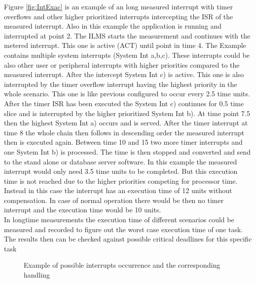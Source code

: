 Figure \ref{fig:IntExac} is an example of an long measured interrupt with timer overflows and other higher prioritized interrupts intercepting the \ac{ISR} of the measured interrupt. Also in this example the application is running and interrupted at point 2. The \ac{ILMS} starts the measurement and continues with the metered interrupt. This one is active (ACT) until point in time 4. The Example contains multiple system interrupts (System Int a,b,c). These interrupts could be also other user or peripheral interrupts with higher priorities compared to the measured interrupt. After the intercept System Int c) is active. This one is also interrupted by the timer overflow interrupt having the highest priority in the whole scenario. This one is like previous configured to occur every 2.5 time units. After the timer \ac{ISR} has been executed the System Int c) continues for 0.5 time slice and is interrupted by the higher prioritized System Int b). At time point 7.5 then the highest System Int a) occurs and is served. After the timer interrupt at time 8 the whole chain then follows in descending order the measured interrupt then is executed again. Between time 10 and 15 two more timer interrupts and one System Int b) is processed. The time is then stopped and converted and send to the stand alone or database server software. In this example the measured interrupt would only need 3.5 time units to be completed. But this execution time is not reached due to the higher priorities competing for processor time. Instead in this case the interrupt has an execution time of 12 units without compensation. In case of normal operation there would be then no timer interrupt and the execution time would be 10 units.\\ 
In longtime measurements the execution time of different scenarios could be measured and recorded to figure out the worst case execution time of one task. The results then can be checked against possible critical deadlines for this specific task\\
\begin{figure}[H]
		\begin{center}
		
		\caption{Example of possible interrupts occurrence and the corresponding handling}
		\label{fig:IntEX}
		\end{center}
\end{figure}


\newpage
